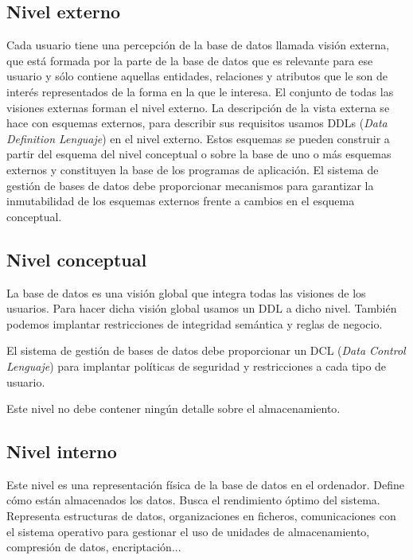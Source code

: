 \documentclass[10pt,a4paper,spanish]{report}
\begin{document}
\textcolor[rgb]{1,0.2,0.3}{\subsection{Nivel externo}}
Cada usuario tiene una percepción de la base de datos llamada visión externa, que está formada por la parte de la base de datos que es relevante para ese usuario y sólo contiene aquellas entidades, relaciones y atributos que le son de interés representados de la forma en la que le interesa. El conjunto de todas las visiones externas forman el nivel externo. La descripción de la vista externa se hace con esquemas externos, para describir sus requisitos usamos DDLs (\textit{\textcolor[rgb]{1,0.2,0.3}{Data Definition Lenguaje}}) en el nivel externo. Estos esquemas se pueden construir a partir del esquema del nivel conceptual o sobre la base de uno o más esquemas externos y constituyen la base de los programas de aplicación. El sistema de gestión de bases de datos debe proporcionar mecanismos para garantizar la inmutabilidad de los esquemas externos frente a cambios en el esquema conceptual.

\textcolor[rgb]{1,0.2,0.3}{\subsection{Nivel conceptual}}
La base de datos es una visión global que integra todas las visiones de los usuarios. Para hacer dicha visión global usamos un DDL a dicho nivel. También podemos implantar restricciones de integridad semántica y reglas de negocio.

El sistema de gestión de bases de datos debe proporcionar un DCL (\textcolor[rgb]{1,0.2,0.3}{\textit{Data Control Lenguaje}}) para implantar políticas de seguridad y restricciones a cada tipo de usuario. 

Este nivel no debe contener ningún detalle sobre el almacenamiento.

\textcolor[rgb]{1,0.2,0.3}{\subsection{Nivel interno}}

Este nivel es una representación física de la base de datos en el ordenador. Define  cómo están almacenados los datos. Busca el rendimiento óptimo del sistema. Representa estructuras de datos, organizaciones en ficheros, comunicaciones con el sistema operativo para gestionar el uso de unidades de almacenamiento, compresión de datos, encriptación...
\end{document}
